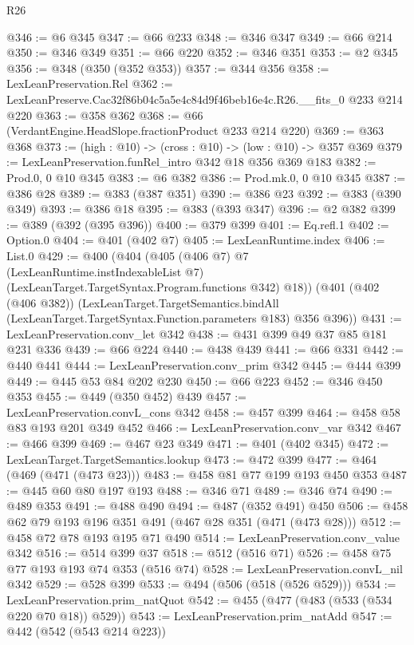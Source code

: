 \begin{lexlean}{R26}
\begin{coremodule}
@346 := @6 @345
@347 := @66 @233
@348 := @346 @347
@349 := @66 @214
@350 := @346 @349
@351 := @66 @220
@352 := @346 @351
@353 := @2 @345
@356 := @348 (@350 (@352 @353))
@357 := @344 @356
@358 := LexLeanPreservation.Rel
@362 := LexLeanPreserve.Cac32f86b04c5a5e4c84d9f46beb16e4c.R26.__fits_0 @233 @214 @220
@363 := @358 @362
@368 := @66 (VerdantEngine.HeadSlope.fractionProduct @233 @214 @220)
@369 := @363 @368
@373 := (high : @10) -> (cross : @10) -> (low : @10) -> @357 @369
@379 := LexLeanPreservation.funRel_intro @342 @18 @356 @369 @183
@382 := Prod.{0, 0} @10 @345
@383 := @6 @382
@386 := Prod.mk.{0, 0} @10 @345
@387 := @386 @28
@389 := @383 (@387 @351)
@390 := @386 @23
@392 := @383 (@390 @349)
@393 := @386 @18
@395 := @383 (@393 @347)
@396 := @2 @382
@399 := @389 (@392 (@395 @396))
@400 := @379 @399
@401 := Eq.refl.{1}
@402 := Option.{0}
@404 := @401 (@402 @7)
@405 := LexLeanRuntime.index
@406 := List.{0}
@429 := @400
    (@404
      (@405
        (@406 @7)
        @7
        (LexLeanRuntime.instIndexableList @7)
        (LexLeanTarget.TargetSyntax.Program.functions @342)
        @18))
    (@401
      (@402 (@406 @382))
      (LexLeanTarget.TargetSemantics.bindAll
        (LexLeanTarget.TargetSyntax.Function.parameters @183)
        @356
        @396))
@431 := LexLeanPreservation.conv_let @342
@438 := @431 @399 @49 @37 @85 @181 @231 @336
@439 := @66 @224
@440 := @438 @439
@441 := @66 @331
@442 := @440 @441
@444 := LexLeanPreservation.conv_prim @342
@445 := @444 @399
@449 := @445 @53 @84 @202 @230
@450 := @66 @223
@452 := @346 @450 @353
@455 := @449 (@350 @452) @439
@457 := LexLeanPreservation.convL_cons @342
@458 := @457 @399
@464 := @458 @58 @83 @193 @201 @349 @452
@466 := LexLeanPreservation.conv_var @342
@467 := @466 @399
@469 := @467 @23 @349
@471 := @401 (@402 @345)
@472 := LexLeanTarget.TargetSemantics.lookup
@473 := @472 @399
@477 := @464 (@469 (@471 (@473 @23)))
@483 := @458 @81 @77 @199 @193 @450 @353
@487 := @445 @60 @80 @197 @193
@488 := @346 @71
@489 := @346 @74
@490 := @489 @353
@491 := @488 @490
@494 := @487 (@352 @491) @450
@506 := @458 @62 @79 @193 @196 @351 @491 (@467 @28 @351 (@471 (@473 @28)))
@512 := @458 @72 @78 @193 @195 @71 @490
@514 := LexLeanPreservation.conv_value @342
@516 := @514 @399 @37
@518 := @512 (@516 @71)
@526 := @458 @75 @77 @193 @193 @74 @353 (@516 @74)
@528 := LexLeanPreservation.convL_nil @342
@529 := @528 @399
@533 := @494 (@506 (@518 (@526 @529)))
@534 := LexLeanPreservation.prim_natQuot
@542 := @455 (@477 (@483 (@533 (@534 @220 @70 @18)) @529))
@543 := LexLeanPreservation.prim_natAdd
@547 := @442 (@542 (@543 @214 @223))

\end{coremodule}
\end{lexlean}
